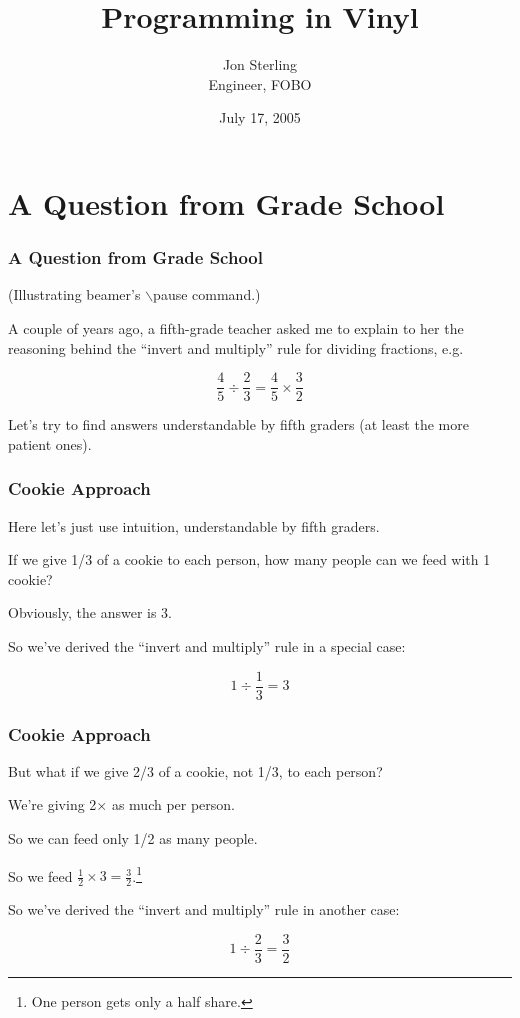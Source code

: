 \documentclass{beamer}
\title{Programming in Vinyl}
\author{Jon Sterling\\
    Engineer, FOBO
}
\date{July 17, 2005}
\begin{document}
\begin{frame}
\titlepage
\end{frame}

\section{A Question from Grade School}

\begin{frame}
\frametitle{A Question from Grade School}

(Illustrating {\sc beamer}'s $\backslash$pause command.)
\vskip 0.5in

A couple of years ago, a fifth-grade teacher asked me to explain to her
the reasoning behind the ``invert and multiply'' rule for dividing
fractions, e.g.
\pause  %

$$
\frac{4}{5} \div \frac{2}{3} = \frac{4}{5} \times \frac{3}{2}
$$

\pause

Let's try to find answers understandable by fifth graders (at least the
more patient ones).

\end{frame}

\begin{frame}
\frametitle{Cookie Approach}

Here let's just use intuition, understandable by fifth graders.

\pause

If we give 1/3 of a cookie to each person, how many people can we
feed with 1 cookie?

\pause

Obviously, the answer is 3.

So we've derived the ``invert and multiply'' rule in a special case:

$$
1 \div \frac{1}{3} = 3
$$

\end{frame}

\begin{frame}
\frametitle{Cookie Approach}

But what if we give 2/3 of a cookie, not 1/3, to each person?

We're giving 2$\times$ as much per person.

So we can feed only 1/2 as many people.

So we feed  $\frac{1}{2} \times 3 = \frac{3}{2}$.\footnote{One person
gets only a half share.}

So we've derived the ``invert and multiply'' rule in another case:

$$
1 \div \frac{2}{3} = \frac{3}{2}
$$

\end{frame}
\end{document}
